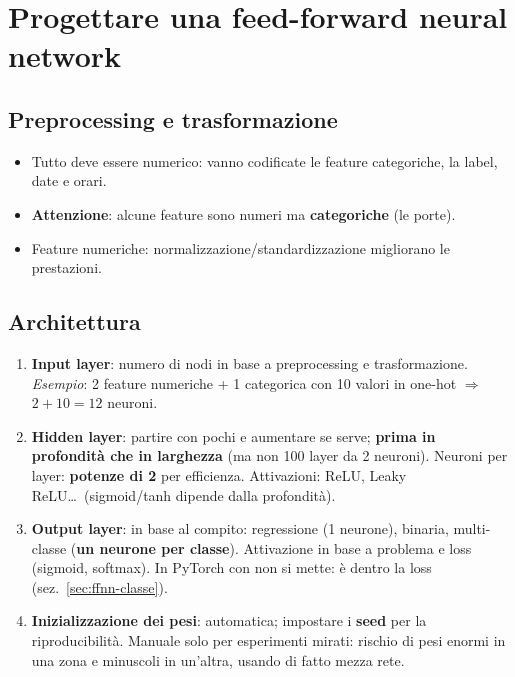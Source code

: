 \section{Progettare una feed-forward neural network}
\label{sec:ffnn-progetto}
\subsection{Preprocessing e trasformazione}
\begin{itemize}
  \item Tutto deve essere numerico: vanno codificate le feature categoriche, la label, date e orari.
  \item \textbf{Attenzione}: alcune feature sono numeri ma \textbf{categoriche} (le porte).
  \item Feature numeriche: normalizzazione/standardizzazione migliorano le prestazioni.
\end{itemize}

\subsection{Architettura}
\begin{enumerate}
  \item \textbf{Input layer}: numero di nodi in base a preprocessing e trasformazione.
        \emph{Esempio}: 2 feature numeriche + 1 categorica con 10 valori in one-hot $\Rightarrow$ $2 + 10 = 12$ neuroni.
  \item \textbf{Hidden layer}: partire con pochi e aumentare se serve; \textbf{prima in profondità che in larghezza}
        (ma non 100 layer da 2 neuroni). Neuroni per layer: \textbf{potenze di 2} per efficienza.
        Attivazioni: ReLU, Leaky ReLU\ldots\ (sigmoid/tanh dipende dalla profondità).
  \item \textbf{Output layer}: in base al compito: regressione (1 neurone), binaria, multi-classe (\textbf{un neurone per classe}).
        Attivazione in base a problema e loss (sigmoid, softmax). In PyTorch con  non si mette:
        è dentro la loss (sez.~\ref{sec:ffnn-classe}).
  \item \textbf{Inizializzazione dei pesi}: automatica; impostare i \textbf{seed} per la riproducibilità. Manuale solo per
        esperimenti mirati: rischio di pesi enormi in una zona e minuscoli in un'altra, usando di fatto mezza rete.
\end{enumerate}


